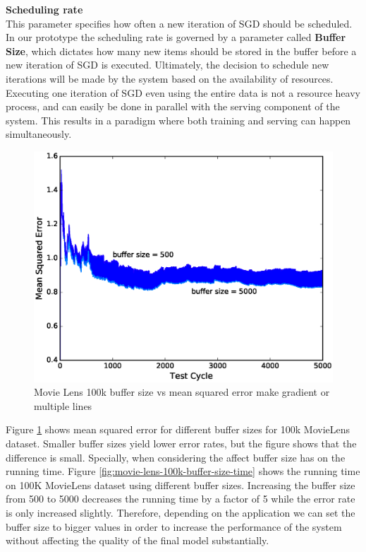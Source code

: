 \documentclass{sig-alternate-05-2015}
\begin{document}
\textbf{Scheduling rate}\\
This parameter specifies how often a new iteration of SGD should be scheduled. 
In our prototype the scheduling rate is governed by a parameter called \textbf{Buffer Size}, which dictates how many new items should be stored in the buffer before a new iteration of SGD is executed. 
Ultimately, the decision to schedule new iterations will be made by the system based on the availability of resources. 
Executing one iteration of SGD even using the entire data is not a resource heavy process, and can easily be done in parallel with the serving component of the system. 
This results in a paradigm where both training and serving can happen simultaneously. 

\begin{figure}[H]
\centering
\includegraphics[width=\columnwidth]{../images/experiment-results/movie-lens-100k-buffer-size.eps}
\caption{Movie Lens 100k buffer size vs mean squared error{\color{red} make gradient or multiple lines}}
\label{fig:movie-lens-100k-buffer-size-mse}
\end{figure}

Figure \ref{fig:movie-lens-100k-buffer-size-mse} shows mean squared error for different buffer sizes for 100k MovieLens dataset. 
Smaller buffer sizes yield lower error rates, but the figure shows that the difference is small.
Specially, when considering the affect buffer size has on the running time.
Figure \ref{fig:movie-lens-100k-buffer-size-time} shows the running time on 100K MovieLens dataset using different buffer sizes. 
Increasing the buffer size from 500 to 5000 decreases the running time by a factor of 5 while the error rate is only increased slightly.
Therefore, depending on the application we can set the buffer size to bigger values in order to increase the performance of the system without affecting the quality of the final model substantially.
\end{document}
